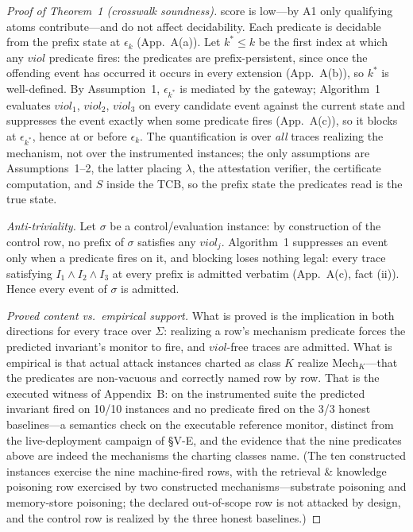 \documentclass[conference]{IEEEtran}
\newcommand{\Ione}{\ensuremath{I_1}}
\newcommand{\Itwo}{\ensuremath{I_2}}
\newcommand{\Ithree}{\ensuremath{I_3}}
\providecommand{\Tr}{\Sigma}
\begin{document}
\begin{proof}[Proof of Theorem~1 (crosswalk soundness)]
score is low---by A1 only qualifying atoms contribute---and do not
affect decidability.
Each predicate is decidable from the prefix state at $\epsilon_k$
(App.~A(a)). Let $k^{*} \leq k$ be the first index at which any
$\mathit{viol}$ predicate fires: the predicates are prefix-persistent,
since once the offending event has occurred it occurs in every
extension (App.~A(b)), so $k^{*}$ is well-defined. By Assumption~1,
$\epsilon_{k^{*}}$ is mediated by the gateway; Algorithm~1 evaluates
$\mathit{viol}_1$, $\mathit{viol}_2$, $\mathit{viol}_3$ on every
candidate event against the current state and suppresses the event
exactly when some predicate fires (App.~A(c)), so it blocks at
$\epsilon_{k^{*}}$, hence at or before $\epsilon_k$. The
quantification is over \emph{all} traces realizing the mechanism, not
over the instrumented instances; the only assumptions are
Assumptions~1--2, the latter placing $\lambda$, the attestation
verifier, the certificate computation, and $S$ inside the TCB, so the
prefix state the predicates read is the true state.

\emph{Anti-triviality.} Let $\sigma$ be a control/evaluation instance:
by construction of the control row, no prefix of $\sigma$ satisfies any
$\mathit{viol}_j$. Algorithm~1 suppresses an event only when a
predicate fires on it, and blocking loses nothing legal: every trace
satisfying $\Ione \wedge \Itwo \wedge \Ithree$ at every prefix is
admitted verbatim (App.~A(c), fact (ii)). Hence every event of
$\sigma$ is admitted.

\emph{Proved content vs.\ empirical support.} What is proved is the
implication in both directions for every trace over $\Tr$: realizing a
row's mechanism predicate forces the predicted invariant's monitor to
fire, and $\mathit{viol}$-free traces are admitted. What is empirical
is that actual attack instances charted as class $K$ realize
$\mathrm{Mech}_K$---that the predicates are non-vacuous and correctly
named row by row. That is the executed witness of Appendix~B: on the
instrumented suite the predicted invariant fired on 10/10 instances
and
no predicate fired on the 3/3 honest baselines---a semantics check on
the executable reference monitor, distinct from the live-deployment
campaign of \S V-E, and the evidence that the nine predicates above
are indeed the mechanisms the charting classes name. (The ten
constructed instances exercise the nine machine-fired rows, with the
retrieval \& knowledge poisoning row exercised by two constructed
mechanisms---substrate poisoning and memory-store poisoning; the
declared out-of-scope row is not attacked by design, and the control
row is realized by the three honest baselines.)
\end{proof}
\end{document}

